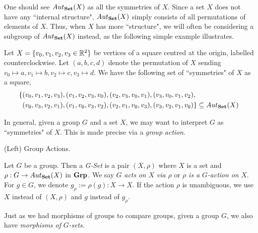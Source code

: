 \documentclass[../book.tex]{subfiles}
\begin{document}
\begin{rmk}

    One should see $Aut_{\mathbf{Set}}(X)$ as all the symmetries of $X$. 
    Since a set $X$ does not have any ``internal structure", 
    $Aut_{\mathbf{Set}}(X)$ simply consists of all permutations of elements of $X$. 
    Thus, when $X$ has more ``structure", 
    we will often be considering a subgroup of $Aut_{\mathbf{Set}}(X)$ instead, 
    as the following simple example illustrates. 
    
\end{rmk}

\begin{eg}
    Let $X = \{v_0, v_1, v_2, v_3 \in \mathbb{R}^2\}$ be 
    vertices of a square centred at the origin, labelled counterclockwise. 
    Let $(a, b, c, d)$ denote the permutation of $X$ sending
    $v_0 \mapsto a, v_1 \mapsto b, v_2 \mapsto c, v_3 \mapsto d$. 
    We have the following set of ``symmetries" of $X$ as a square, 
    \begin{align*}
        \{
            &(v_0, v_1, v_2, v_3), (v_1, v_2, v_3, v_0), 
            (v_2, v_3, v_0, v_1), (v_3, v_0, v_1, v_2), \\
            &(v_0, v_3, v_2, v_1), (v_1, v_0, v_3, v_2), 
            (v_2, v_1, v_0, v_3), (v_3, v_2, v_1, v_0)
        \} \subseteq Aut_{\mathbf{Set}}(X)
    \end{align*}
    
\end{eg}

\begin{rmk}
    In general, given a group $G$ and a set $X$, 
    we may want to interpret $G$ as ``symmetries" of $X$. 
    This is made precise via a \emph{group action}. 
\end{rmk}

\begin{dfn} (Left) Group Actions. 

    Let $G$ be a group. 
    Then a \emph{G-Set} is a pair $(X, \rho)$ where 
    $X$ is a set and $\rho : G \to Aut_{\mathbf{Set}}(X)$ in $\mathbf{Grp}$.
    We say \emph{$G$ acts on $X$ via $\rho$} or 
    \emph{$\rho$ is a $G$-action on $X$}. 
    For $g \in G$, we denote $g_\rho := \rho(g) : X \to X$. 
    If the action $\rho$ is unambiguous, we use $X$ instead of $(X,\rho)$
    and $g$ instead of $g_\rho$.
    
\end{dfn}

Just as we had morphisms of groups to compare groups, 
given a group $G$, we also have \emph{morphisms of $G$-sets}. 
\end{document}
